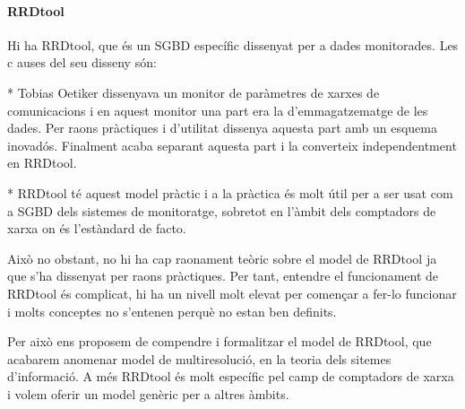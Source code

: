 





\paragraph{RRDtool}



Hi ha RRDtool, que és un SGBD específic dissenyat per a dades monitorades. Les c
auses del seu disseny són:

* Tobias Oetiker dissenyava un monitor de paràmetres de xarxes de comunicacions i en aquest monitor una part era la d'emmagatzematge de les dades. Per raons pràctiques i d'utilitat dissenya aquesta part amb un esquema inovadós. Finalment acaba separant aquesta part i la converteix independentment en RRDtool.

* RRDtool té aquest model pràctic i a la pràctica és molt útil per a ser usat com a SGBD dels sistemes de monitoratge, sobretot en l'àmbit dels comptadors de xarxa on és l'estàndard de facto. 

Això no obstant, no hi ha cap raonament teòric sobre el model de RRDtool ja que s'ha dissenyat per raons pràctiques. Per tant, entendre el funcionament de RRDtool és complicat, hi ha un nivell molt elevat per començar a fer-lo funcionar i molts conceptes no s'entenen perquè no estan ben definits. 

Per això ens proposem de compendre i formalitzar el model de RRDtool, que acabarem anomenar model de multiresolució, en la teoria dels sitemes d'informació. A més RRDtool és molt específic pel camp de comptadors de xarxa i volem oferir un model genèric per a altres àmbits.  



